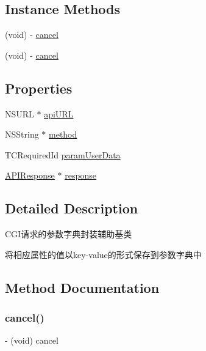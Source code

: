 \subsection*{Instance Methods}
\begin{DoxyCompactItemize}
\item 
(void) -\/ \mbox{\hyperlink{interface_t_c_a_p_i_request_afe52466ae0b017da705fdbd3c4052149}{cancel}}
\item 
(void) -\/ \mbox{\hyperlink{interface_t_c_a_p_i_request_afe52466ae0b017da705fdbd3c4052149}{cancel}}
\end{DoxyCompactItemize}
\subsection*{Properties}
\begin{DoxyCompactItemize}
\item 
N\+S\+U\+RL $\ast$ \mbox{\hyperlink{interface_t_c_a_p_i_request_a44d82a17741381270121ea59315405fa}{api\+U\+RL}}
\item 
N\+S\+String $\ast$ \mbox{\hyperlink{interface_t_c_a_p_i_request_ab0ced56d2a2b7dc4f8dd722bf962435e}{method}}
\item 
T\+C\+Required\+Id \mbox{\hyperlink{interface_t_c_a_p_i_request_a0e885d2fd2fe7cb258147c6cb860e959}{param\+User\+Data}}
\item 
\mbox{\hyperlink{interface_a_p_i_response}{A\+P\+I\+Response}} $\ast$ \mbox{\hyperlink{interface_t_c_a_p_i_request_ab44c438c454d8193e574e09909249a16}{response}}
\end{DoxyCompactItemize}


\subsection{Detailed Description}
C\+G\+I请求的参数字典封装辅助基类 

将相应属性的值以key-\/value的形式保存到参数字典中 

\subsection{Method Documentation}
\mbox{\label{interface_t_c_a_p_i_request_afe52466ae0b017da705fdbd3c4052149}} 
\subsubsection{\texorpdfstring{cancel()}{cancel()}\hspace{0.1cm}{\footnotesize\ttfamily [1/2]}}
{\footnotesize\ttfamily -\/ (void) cancel \begin{DoxyParamCaption}{ }\end{DoxyParamCaption}}

